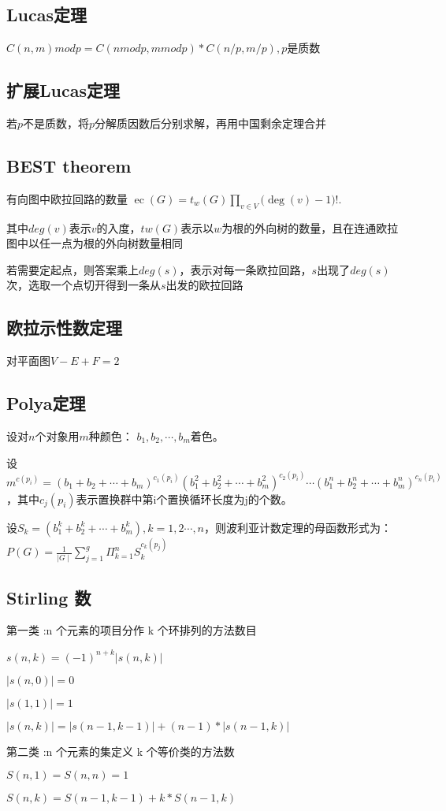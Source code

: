 \subsection{Lucas定理}
$C(n,m) mod p = C(n mod p, m mod p) * C(n / p, m / p),p$是质数\par

\subsection{扩展Lucas定理}
若$p$不是质数，将$p$分解质因数后分别求解，再用中国剩余定理合并\par

\subsection{BEST theorem}
有向图中欧拉回路的数量
 ${\displaystyle \operatorname {ec} (G)=t_{w}(G)\prod _{v\in V}{\bigl (}\deg(v)-1{\bigr )}!.} $ \par
其中$deg(v)$表示$v$的入度，$tw(G)$表示以$w$为根的外向树的数量，且在连通欧拉图中以任一点为根的外向树数量相同\par
若需要定起点，则答案乘上$deg(s)$，表示对每一条欧拉回路，$s$出现了$deg(s)$次，选取一个点切开得到一条从$s$出发的欧拉回路

\subsection{欧拉示性数定理}
对平面图$V-E+F=2$\par

\subsection{Polya定理}
设对$n$个对象用$m$种颜色： ${\displaystyle b_{1},b_{2},\cdots ,b_{m}}$着色。\par
设${\displaystyle m^{c(p_{i})}=(b_{1}+b_{2}+\cdots +b_{m})^{c_{1}(p_{i})}(b_{1}^{2}+b_{2}^{2}+\cdots +b_{m}^{2})^{c_{2}(p_{i})}\cdots (b_{1}^{n}+b_{2}^{n}+\cdots +b_{m}^{n})^{c_{n}(p_{i})}}$，其中${\displaystyle c_{j}(p_{i})}$表示置换群中第i个置换循环长度为j的个数。\par
设${\displaystyle S_{k}=(b_{1}^{k}+b_{2}^{k}+\cdots +b_{m}^{k}),k=1,2\cdots ,n}$，则波利亚计数定理的母函数形式为：${\displaystyle P(G)={\frac {1}{\mid G\mid }}\sum _{j=1}^{g}\Pi _{k=1}^{n}S_{k}^{c_{k}(p_{j})}}$\par
\subsection{Stirling 数}
第一类 :n 个元素的项目分作 k 个环排列的方法数目\par
$s(n, k) = (-1)^{n+k}|s(n, k)|$\par
$|s(n, 0)| =0$\par
$|s(1, 1)| =1$\par
$|s(n, k)| =|s(n-1, k-1)|+(n-1)*|s(n-1, k)|$\par
第二类 :n 个元素的集定义 k 个等价类的方法数\par
$    S(n,1)=S(n,n)=1$\par
 $   S(n,k)=S(n-1,k-1)+k*S(n-1,k)$\par

